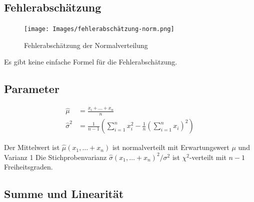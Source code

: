 \documentclass[../Main.tex]{subfiles}
\begin{document}
\subsection{Fehlerabschätzung}
\begin{figure}[H]
    \centering
    \texttt{[image: Images/fehlerabschätzung-norm.png]}
    \caption{Fehlerabschätzung der Normalverteilung}
\end{figure}
Es gibt keine einfache Formel für die Fehlerabschätzung.

\subsection{Parameter}
\begin{equation}
    \begin{split}
        \hat{\mu} &= \frac{x_i + \dots + x_n}{n} \\
        \hat{\sigma}^2 &= \frac{1}{n-1} (\sum_{i=1}^{n} x_i^2 - \frac{1}{n}(\sum_{i=1}^{n}x_i)^2)
    \end{split}
\end{equation}

Der Mittelwert ist \(\hat{\mu}(x_1, \dots + x_n)\) ist normalverteilt mit Erwartungswert \(\mu\) und Varianz 1
Die Stichprobenvarianz \(\hat{\sigma}(x_1,\dots + x_n)^2/\sigma^2\) ist \(\chi^2\)-verteilt mit \(n-1\) Freiheitsgraden.

\subsection{Summe und Linearität}

\end{document}
